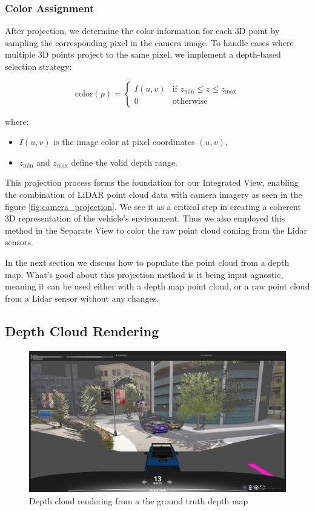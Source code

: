 \subsubsection{Color Assignment}

After projection, we determine the color information for each 3D point by sampling the corresponding pixel in the camera image. To handle cases where multiple 3D points project to the same pixel, we implement a depth-based selection strategy:

\[
\text{color}(p) =
\begin{cases}
I(u,v) & \text{if } z_{\min} \leq z \leq z_{\max} \\
0 & \text{otherwise}
\end{cases}
\]

where:
\begin{itemize}
    \item \( I(u,v) \) is the image color at pixel coordinates \( (u,v) \),
    \item \( z_{\min} \) and \( z_{\max} \) define the valid depth range.
\end{itemize}

This projection process forms the foundation for our Integrated View,
enabling the combination of LiDAR point cloud data with camera imagery as seen in the figure \ref{fig:camera_projection}.
We see it as a critical step in creating a coherent 3D representation of the vehicle's environment.
Thus we also employed this method in the Separate View to color the raw point cloud
coming from the Lidar sensors.

In the next section we discuss how to populate the point cloud from a depth map. What's good about this
projection method is it being input agnostic, meaning it can be used either with a depth map point cloud,
or a raw point cloud from a Lidar sensor without any changes.

\subsection{Depth Cloud Rendering}

\begin{figure}
    \centering
    \includegraphics[width=\textwidth, trim=0 150pt 0 50pt, clip]{figures/gt.png}
    \caption{Depth cloud rendering from a the ground truth depth map}
    \label{fig:depth_cloud}
\end{figure}

